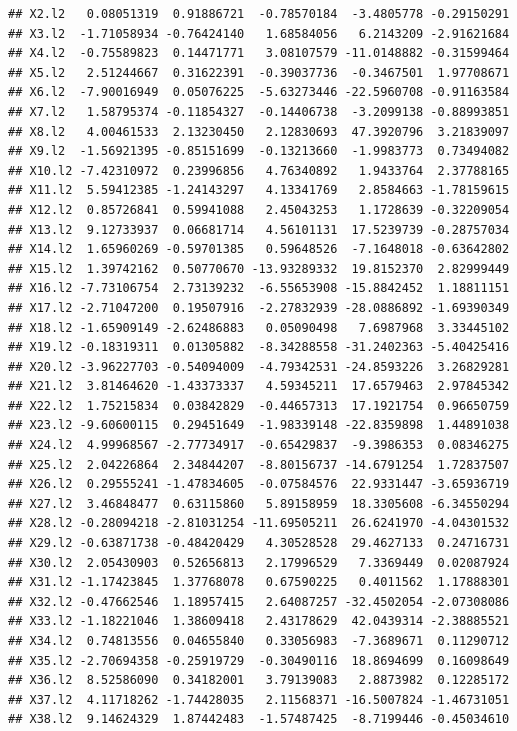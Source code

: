 \documentclass[]{article}
\begin{document}
\begin{verbatim}
## X2.l2   0.08051319  0.91886721  -0.78570184  -3.4805778 -0.29150291
## X3.l2  -1.71058934 -0.76424140   1.68584056   6.2143209 -2.91621684
## X4.l2  -0.75589823  0.14471771   3.08107579 -11.0148882 -0.31599464
## X5.l2   2.51244667  0.31622391  -0.39037736  -0.3467501  1.97708671
## X6.l2  -7.90016949  0.05076225  -5.63273446 -22.5960708 -0.91163584
## X7.l2   1.58795374 -0.11854327  -0.14406738  -3.2099138 -0.88993851
## X8.l2   4.00461533  2.13230450   2.12830693  47.3920796  3.21839097
## X9.l2  -1.56921395 -0.85151699  -0.13213660  -1.9983773  0.73494082
## X10.l2 -7.42310972  0.23996856   4.76340892   1.9433764  2.37788165
## X11.l2  5.59412385 -1.24143297   4.13341769   2.8584663 -1.78159615
## X12.l2  0.85726841  0.59941088   2.45043253   1.1728639 -0.32209054
## X13.l2  9.12733937  0.06681714   4.56101131  17.5239739 -0.28757034
## X14.l2  1.65960269 -0.59701385   0.59648526  -7.1648018 -0.63642802
## X15.l2  1.39742162  0.50770670 -13.93289332  19.8152370  2.82999449
## X16.l2 -7.73106754  2.73139232  -6.55653908 -15.8842452  1.18811151
## X17.l2 -2.71047200  0.19507916  -2.27832939 -28.0886892 -1.69390349
## X18.l2 -1.65909149 -2.62486883   0.05090498   7.6987968  3.33445102
## X19.l2 -0.18319311  0.01305882  -8.34288558 -31.2402363 -5.40425416
## X20.l2 -3.96227703 -0.54094009  -4.79342531 -24.8593226  3.26829281
## X21.l2  3.81464620 -1.43373337   4.59345211  17.6579463  2.97845342
## X22.l2  1.75215834  0.03842829  -0.44657313  17.1921754  0.96650759
## X23.l2 -9.60600115  0.29451649  -1.98339148 -22.8359898  1.44891038
## X24.l2  4.99968567 -2.77734917  -0.65429837  -9.3986353  0.08346275
## X25.l2  2.04226864  2.34844207  -8.80156737 -14.6791254  1.72837507
## X26.l2  0.29555241 -1.47834605  -0.07584576  22.9331447 -3.65936719
## X27.l2  3.46848477  0.63115860   5.89158959  18.3305608 -6.34550294
## X28.l2 -0.28094218 -2.81031254 -11.69505211  26.6241970 -4.04301532
## X29.l2 -0.63871738 -0.48420429   4.30528528  29.4627133  0.24716731
## X30.l2  2.05430903  0.52656813   2.17996529   7.3369449  0.02087924
## X31.l2 -1.17423845  1.37768078   0.67590225   0.4011562  1.17888301
## X32.l2 -0.47662546  1.18957415   2.64087257 -32.4502054 -2.07308086
## X33.l2 -1.18221046  1.38609418   2.43178629  42.0439314 -2.38885521
## X34.l2  0.74813556  0.04655840   0.33056983  -7.3689671  0.11290712
## X35.l2 -2.70694358 -0.25919729  -0.30490116  18.8694699  0.16098649
## X36.l2  8.52586090  0.34182001   3.79139083   2.8873982  0.12285172
## X37.l2  4.11718262 -1.74428035   2.11568371 -16.5007824 -1.46731051
## X38.l2  9.14624329  1.87442483  -1.57487425  -8.7199446 -0.45034610

\end{verbatim}
\end{document}
